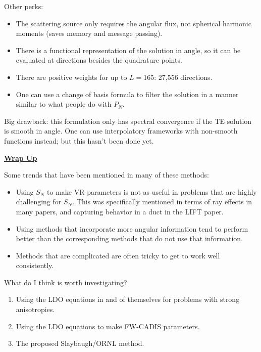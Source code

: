 \documentclass[12pt,twoside]{article}
\begin{document}
\vspace{1 em}
\noindent Other perks:
\begin{itemize}
\item The scattering source only requires the angular flux, not spherical harmonic moments (saves memory and message passing).
\item There is a functional representation of the solution in angle, so it can be evaluated at directions besides the quadrature points.
\item There are positive weights for up to $L=165$: 27,556 directions.
\item One can use a change of basis formula to filter the solution in a manner similar to what people do with $P_N$. 
\end{itemize}

Big drawback: this formulation only has spectral convergence if the TE solution is smooth in angle. One can use interpolatory frameworks with non-smooth functions instead; but this hasn't been done yet. 


\vspace*{3em}
\begin{center}
\underline{\textbf{Wrap Up}}
\end{center}

\noindent Some trends that have been mentioned in many of these methods:
\begin{itemize}
\item Using $S_N$ to make VR parameters is not as useful in problems that are highly challenging for $S_N$. This was specifically mentioned in terms of ray effects in many papers, and capturing behavior in a duct in the LIFT paper. 

\item Using methods that incorporate more angular information tend to perform better than the corresponding methods that do not use that information.

\item Methods that are complicated are often tricky to get to work well consistently.
\end{itemize}

\noindent What do I think is worth investigating? 
\begin{enumerate}
\item Using the LDO equations in and of themselves for problems with strong anisotropies.

\item Using the LDO equations to make FW-CADIS parameters.

\item The proposed Slaybaugh/ORNL method.
\end{enumerate}
\end{document}
